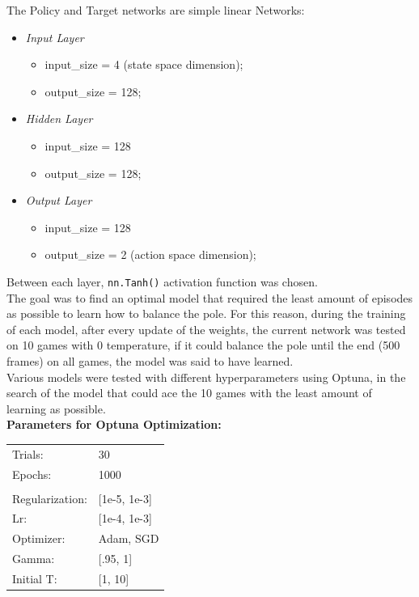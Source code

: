 \documentclass[11pt,a4paper,twocolumn]{IEEEtran}
\newcommand{\thinsepline}{\noindent\makebox[\linewidth]{\rule{7.5cm}{0.02pt}}}
\begin{document}
		
		The Policy and Target networks are simple linear Networks:
		\begin{itemize}
			\item \textit{Input Layer}
			\begin{itemize}
				\item input\_size = 4 (state space dimension);
				\item output\_size = 128;
			\end{itemize}
			\item \textit{Hidden Layer}
			\begin{itemize}
				\item input\_size = 128
				\item output\_size = 128;
			\end{itemize}
			\item \textit{Output Layer}
			\begin{itemize}
				\item input\_size = 128
				\item output\_size = 2 (action space dimension);
			\end{itemize}
		\end{itemize}
		Between each layer, \texttt{nn.Tanh()} activation function was chosen.\medskip\\
		
		The goal was to find an optimal model that required the least amount of episodes as possible to learn how to balance the pole. For this reason, during the training of each model, after every update of the weights, the current network was tested on 10 games with 0 temperature, if it could balance the pole until the end (500 frames) on all games, the model was said
		to have learned.\medskip\\
		
		Various models were tested with different hyperparameters using Optuna, in the search of the model that could ace the 10 games with the least amount of learning as possible.
		\thinsepline\\
		\textbf{Parameters for Optuna Optimization:}\medskip\\
		\begin{tabular}{ll}
			Trials: & 30 \\
			Epochs: & 1000 \\
			\hline\vspace*{-.4cm}\\
			Regularization: & [1e-5, 1e-3] \\
			Lr: & [1e-4, 1e-3] \\
			Optimizer: & Adam, SGD\\
			Gamma: & [.95, 1]\\
			Initial T:& [1, 10]\\
		\end{tabular}\\
		\thinsepline\\
		\newpage
\end{document}
